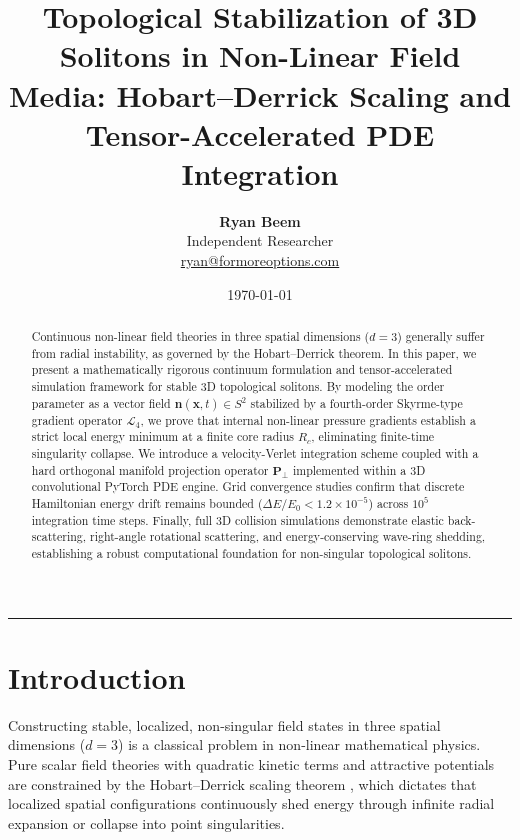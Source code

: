 \documentclass[11pt,a4paper]{article}
\title{\Large\bfseries Topological Stabilization of 3D Solitons in Non-Linear Field Media: Hobart--Derrick Scaling and Tensor-Accelerated PDE Integration}
\author{
	\textbf{Ryan Beem}\\[0.5em]
	\small Independent Researcher \\
	\small \href{mailto:ryan@formoreoptions.com}{ryan@formoreoptions.com}
}
\date{\today}
\begin{document}
	
	\maketitle
	
	\begin{abstract}
		Continuous non-linear field theories in three spatial dimensions ($d = 3$) generally suffer from radial instability, as governed by the Hobart--Derrick theorem. In this paper, we present a mathematically rigorous continuum formulation and tensor-accelerated simulation framework for stable 3D topological solitons. By modeling the order parameter as a vector field $\mathbf{n}(\mathbf{x}, t) \in S^2$ stabilized by a fourth-order Skyrme-type gradient operator $\mathcal{L}_4$, we prove that internal non-linear pressure gradients establish a strict local energy minimum at a finite core radius $R_c$, eliminating finite-time singularity collapse. We introduce a velocity-Verlet integration scheme coupled with a hard orthogonal manifold projection operator $\mathbf{P}_\perp$ implemented within a 3D convolutional PyTorch PDE engine. Grid convergence studies confirm that discrete Hamiltonian energy drift remains bounded ($\Delta E / E_0 < 1.2 \times 10^{-5}$) across $10^5$ integration time steps. Finally, full 3D collision simulations demonstrate elastic back-scattering, right-angle rotational scattering, and energy-conserving wave-ring shedding, establishing a robust computational foundation for non-singular topological solitons.
	\end{abstract}
	
	\vspace{1em}
	\hrule
	\vspace{1.5em}
	
	\section{Introduction}
	\label{sec:intro}
	
	Constructing stable, localized, non-singular field states in three spatial dimensions ($d = 3$) is a classical problem in non-linear mathematical physics. Pure scalar field theories with quadratic kinetic terms and attractive potentials are constrained by the Hobart--Derrick scaling theorem \cite{Hobart1963, Derrick1964}, which dictates that localized spatial configurations continuously shed energy through infinite radial expansion or collapse into point singularities.
	
\end{document}
